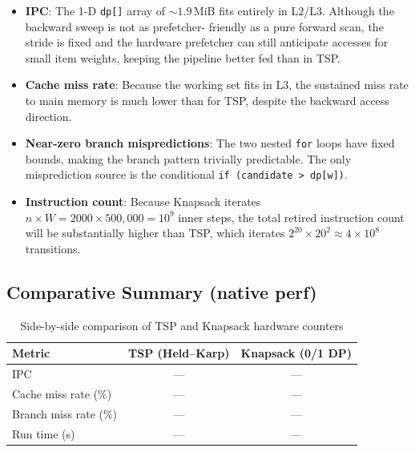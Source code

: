\documentclass[11pt,a4paper]{article}
\begin{document}
\begin{itemize}[leftmargin=*]
    \item \textbf{IPC}: The 1-D \texttt{dp[]} array of ${\sim}1.9$\,MiB fits
          entirely in L2/L3.  Although the backward sweep is not as prefetcher-
          friendly as a pure forward scan, the stride is fixed and the hardware
          prefetcher can still anticipate accesses for small item weights,
          keeping the pipeline better fed than in TSP.

    \item \textbf{Cache miss rate}: Because the working set fits in L3, the
          sustained miss rate to main memory is much lower than for TSP,
          despite the backward access direction.

    \item \textbf{Near-zero branch mispredictions}: The two nested \texttt{for}
          loops have fixed bounds, making the branch pattern trivially
          predictable.  The only misprediction source is the conditional
          \texttt{if (candidate > dp[w])}.

    \item \textbf{Instruction count}: Because Knapsack iterates $n \times W =
          2000 \times 500{,}000 = 10^9$ inner steps, the total retired
          instruction count will be substantially higher than TSP, which
          iterates $2^{20} \times 20^2 \approx 4 \times 10^8$ transitions.
\end{itemize}

\subsection{Comparative Summary (native perf)}

\begin{table}[h!]
\centering
\caption{Side-by-side comparison of TSP and Knapsack hardware counters}
\label{tab:compare}
\begin{tabular}{lcc}
\toprule
\textbf{Metric} & \textbf{TSP (Held--Karp)} & \textbf{Knapsack (0/1 DP)} \\
\midrule
IPC                  & ---   & ---   \\
Cache miss rate (\%) & ---   & ---   \\
Branch miss rate (\%)& ---   & ---   \\
Run time (s)         & ---   & ---   \\
\bottomrule
\end{tabular}
\end{table}
\end{document}
